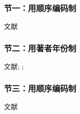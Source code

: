 \documentclass{article}
\begin{document}
\subsubsection*{节一：用顺序编码制}
\begin{refsection}
文献\cite{Yi2013--}
\parencite{WHO1970--}
\cite{FOURNEY1971-17-38}

\vspace{-0.5cm}
\printbibliography[heading=subbibliography]
\end{refsection}
\vspace{-0.5cm}
\subsubsection*{节二：用著者年份制}
\begin{refsection}
文献\cite{FOURNEY1971-17-38};
\parencite{abx2007-500-503};
\textcite{张伯伟2002--}

\vspace{-0.5cm}
\printbibliography[heading=subbibliography]%
\end{refsection}
\vspace{-0.5cm}
\subsubsection*{节三：用顺序编码制}
\begin{refsection}
文献\cite{Yi2013--}
\parencite{abx2007-500-503}
\cite{张伯伟2002--}

\vspace{-0.5cm}
\printbibliography[heading=subbibliography]
\end{refsection}
\end{document}
